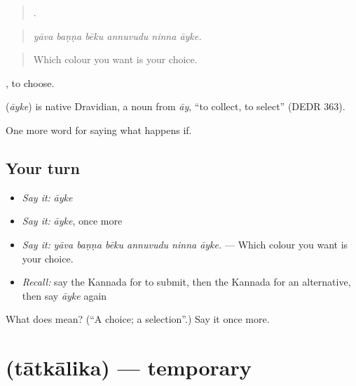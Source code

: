 \begin{quote}
     .
\end{quote}

\begin{quote}
\emph{yāva baṇṇa bēku annuvudu ninna āyke.}
\end{quote}

\begin{quote}
Which colour you want is your choice.
\end{quote}

 , to choose.

\begin{cousinweb}
\textbf{} (\emph{āyke}) is native Dravidian, a noun from \emph{āy}, \textquotedblleft{}to collect, to select\textquotedblright{} (DEDR 363).
\end{cousinweb}

\begin{grammarlens}[title={What you've built}]
One more word for saying what happens if.
\end{grammarlens}

\subsection*{Your turn}
\begin{itemize}
\raggedright
  \item \emph{Say it:} \emph{āyke}
  \item \emph{Say it:} \emph{āyke}, once more
  \item \emph{Say it:} \emph{yāva baṇṇa bēku annuvudu ninna āyke.} — Which colour you want is your choice.
  \item \emph{Recall:} say the Kannada for to submit, then the Kannada for an alternative, then say \emph{āyke} again
\end{itemize}

\begin{tcolorbox}[breakable,colback=teal!4,colframe=teal!35!black,title={Before you move on}]
What does  mean? (\textquotedblleft{}A choice; a selection\textquotedblright{}.) Say it once more.
\end{tcolorbox}
\section[\texorpdfstring{\kn{ತಾತ್ಕಾಲಿಕ} (tātkālika)}{ತಾತ್ಕಾಲಿಕ (tātkālika)}]{ (tātkālika) — temporary}

